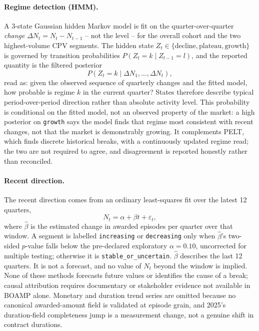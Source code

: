 \documentclass[11pt,a4paper]{article}
\begin{document}
\paragraph{Regime detection (HMM).} A 3-state Gaussian hidden Markov model is
fit on the quarter-over-quarter \emph{change}
\(\Delta N_t=N_t-N_{t-1}\) -- not the level -- for the overall cohort and the
two highest-volume CPV segments. The hidden state
\(Z_t\in\{\text{decline},\text{plateau},\text{growth}\}\) is governed by
transition probabilities \(P(Z_t=k\mid Z_{t-1}=l)\), and the reported quantity
is the filtered posterior
\[
P(Z_t=k \mid \Delta N_1,\dots,\Delta N_t),
\]
read as: given the observed sequence of quarterly changes and the fitted model,
how probable is regime \(k\) in the current quarter? States therefore describe
typical period-over-period direction rather than absolute activity level. This
probability is conditional on the fitted model, not an observed property of the
market: a high posterior on \texttt{growth} says the model finds that regime
most consistent with recent changes, not that the market is demonstrably
growing. It complements PELT, which finds discrete historical breaks, with a
continuously updated regime read; the two are not required to agree, and
disagreement is reported honestly rather than reconciled.

\paragraph{Recent direction.} The recent direction comes from an ordinary
least-squares fit over the latest 12 quarters,
\[
N_t=\alpha+\beta t+\varepsilon_t,
\]
where \(\hat{\beta}\) is the estimated change in awarded episodes per quarter
over that window. A segment is labelled \texttt{increasing} or
\texttt{decreasing} only when \(\hat{\beta}\)'s two-sided \(p\)-value falls
below the pre-declared exploratory \(\alpha=0.10\), uncorrected for multiple
testing; otherwise it is \texttt{stable\_or\_uncertain}. \(\hat{\beta}\)
describes the last 12 quarters. It is not a forecast, and no value of \(N_t\)
beyond the window is implied. None of these methods forecasts future values or
identifies the cause of a break; causal attribution requires documentary or
stakeholder evidence not available in BOAMP alone. Monetary and duration trend
series are omitted because no canonical awarded-amount field is validated at
episode grain, and 2025's duration-field completeness jump is a measurement
change, not a genuine shift in contract durations.
\end{document}
